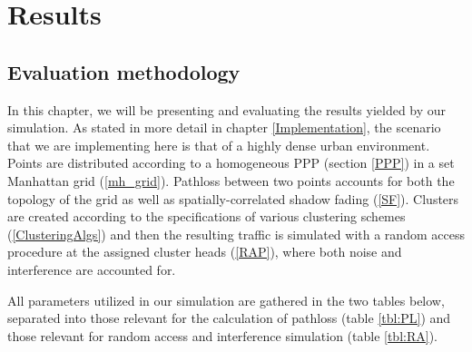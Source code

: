 \chapter{Results} \label{Results}

\section{Evaluation methodology}

In this chapter, we will be presenting and evaluating the results yielded by our simulation. As stated in more detail in chapter \ref{Implementation}, the scenario that we are implementing here is that of a highly dense urban environment. Points are distributed according to a homogeneous PPP (section \ref{PPP}) in a set Manhattan grid (\ref{mh_grid}). Pathloss between two points accounts for both the topology of the grid as well as spatially-correlated shadow fading (\ref{SF}). Clusters are created according to the specifications of various clustering schemes (\ref{ClusteringAlgs}) and then the resulting traffic is simulated with a random access procedure at the assigned cluster heads (\ref{RAP}), where both noise and interference are accounted for.

All parameters utilized in our simulation are gathered in the two tables below, separated into those relevant for the calculation of pathloss (table \ref{tbl:PL}) and those relevant for random access and interference simulation (table \ref{tbl:RA}).


